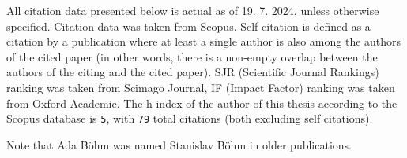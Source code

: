 All citation data presented below is actual as of 19. 7. 2024, unless otherwise
            specified. Citation data was taken from Scopus.
Self citation is defined as a citation by a publication where at least a single author is also among
the authors of the cited paper (in other words, there is a non-empty overlap between the authors of the citing and the cited paper).
SJR (Scientific Journal Rankings) ranking was taken from Scimago Journal,
IF (Impact Factor) ranking was taken from Oxford Academic.
The h-index of the author of this thesis according to the Scopus database is \texttt{5},
with \texttt{79} total citations (both excluding self citations).

Note that Ada Böhm was named Stanislav Böhm in older publications.

